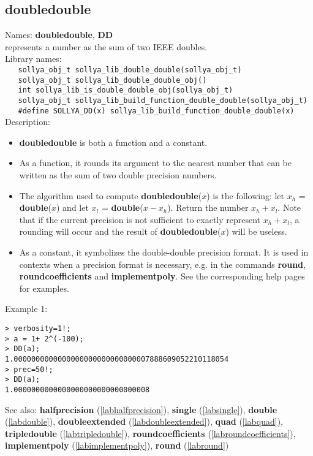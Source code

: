 \subsection{doubledouble}
\label{labdoubledouble}
\noindent Names: \textbf{doubledouble}, \textbf{DD}\\
\phantom{aaa}represents a number as the sum of two IEEE doubles.\\[0.2cm]
\noindent Library names:\\
\verb|   sollya_obj_t sollya_lib_double_double(sollya_obj_t)|\\
\verb|   sollya_obj_t sollya_lib_double_double_obj()|\\
\verb|   int sollya_lib_is_double_double_obj(sollya_obj_t)|\\
\verb|   sollya_obj_t sollya_lib_build_function_double_double(sollya_obj_t)|\\
\verb|   #define SOLLYA_DD(x) sollya_lib_build_function_double_double(x)|\\[0.2cm]
\noindent Description: \begin{itemize}

\item \textbf{doubledouble} is both a function and a constant.

\item As a function, it rounds its argument to the nearest number that can be written
   as the sum of two double precision numbers.

\item The algorithm used to compute \textbf{doubledouble}($x$) is the following: let $x_h$ = \textbf{double}($x$)
   and let $x_l$ = \textbf{double}($x-x_h$). Return the number $x_h+x_l$. Note that if the current 
   precision is not sufficient to exactly represent $x_h + x_l$, a rounding will occur
   and the result of \textbf{doubledouble}($x$) will be useless.

\item As a constant, it symbolizes the double-double precision format. It is used in 
   contexts when a precision format is necessary, e.g. in the commands 
   \textbf{round}, \textbf{roundcoefficients} and \textbf{implementpoly}.
   See the corresponding help pages for examples.
\end{itemize}
\noindent Example 1: 
\begin{center}\begin{minipage}{15cm}\begin{Verbatim}[frame=single]
> verbosity=1!;
> a = 1+ 2^(-100);
> DD(a);
1.0000000000000000000000000000007888609052210118054
> prec=50!;
> DD(a);
1.0000000000000000000000000000008
\end{Verbatim}
\end{minipage}\end{center}
See also: \textbf{halfprecision} (\ref{labhalfprecision}), \textbf{single} (\ref{labsingle}), \textbf{double} (\ref{labdouble}), \textbf{doubleextended} (\ref{labdoubleextended}), \textbf{quad} (\ref{labquad}), \textbf{tripledouble} (\ref{labtripledouble}), \textbf{roundcoefficients} (\ref{labroundcoefficients}), \textbf{implementpoly} (\ref{labimplementpoly}), \textbf{round} (\ref{labround})
